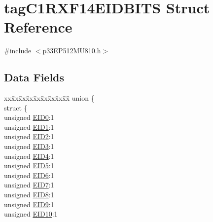 \hypertarget{structtag_c1_r_x_f14_e_i_d_b_i_t_s}{}\section{tag\+C1\+R\+X\+F14\+E\+I\+D\+B\+I\+TS Struct Reference}
\label{structtag_c1_r_x_f14_e_i_d_b_i_t_s}


{\ttfamily \#include $<$p33\+E\+P512\+M\+U810.\+h$>$}

\subsection*{Data Fields}
\begin{DoxyCompactItemize}
\item 
\begin{tabbing}
xx\=xx\=xx\=xx\=xx\=xx\=xx\=xx\=xx\=\kill
union \{\\
\>struct \{\\
\>\>unsigned \hyperlink{structtag_c1_r_x_f14_e_i_d_b_i_t_s_a9da8b7b30247e4f9cd8cc056549aa9fd}{EID0}:1\\
\>\>unsigned \hyperlink{structtag_c1_r_x_f14_e_i_d_b_i_t_s_afd6c139491d147c1262f3d051c6691e9}{EID1}:1\\
\>\>unsigned \hyperlink{structtag_c1_r_x_f14_e_i_d_b_i_t_s_a36ec62d8d3c5acd5d15e6691dc099a94}{EID2}:1\\
\>\>unsigned \hyperlink{structtag_c1_r_x_f14_e_i_d_b_i_t_s_ab895f7d0ac289a0383b607cbc62eebe2}{EID3}:1\\
\>\>unsigned \hyperlink{structtag_c1_r_x_f14_e_i_d_b_i_t_s_a136d5a709d6618d40acceccb43036656}{EID4}:1\\
\>\>unsigned \hyperlink{structtag_c1_r_x_f14_e_i_d_b_i_t_s_a8dffb2d86a6c184df505ae7c71a58710}{EID5}:1\\
\>\>unsigned \hyperlink{structtag_c1_r_x_f14_e_i_d_b_i_t_s_af8a8574102515d8f1a4b7fd1685d0532}{EID6}:1\\
\>\>unsigned \hyperlink{structtag_c1_r_x_f14_e_i_d_b_i_t_s_a84c3262e67f8d5fd387ac10bde6fa9b1}{EID7}:1\\
\>\>unsigned \hyperlink{structtag_c1_r_x_f14_e_i_d_b_i_t_s_acca25e0b7d86eb499d01f85222baea87}{EID8}:1\\
\>\>unsigned \hyperlink{structtag_c1_r_x_f14_e_i_d_b_i_t_s_ac6748f73d4ada8538b06548be4f396c2}{EID9}:1\\
\>\>unsigned \hyperlink{structtag_c1_r_x_f14_e_i_d_b_i_t_s_a9cea8e77ecbb72bd3b08102412793725}{EID10}:1\\

\end{tabbing}
\end{DoxyCompactItemize}
